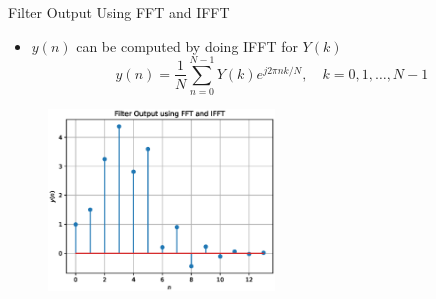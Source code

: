 \documentclass{beamer}
\begin{document}
\begin{frame}{Filter Output Using FFT and IFFT}
\begin{itemize}
    \item $y(n)$ can be computed by doing IFFT for $Y(k)$
    \[y(n) = \frac{1}{N}\sum_{n=0}^{N-1}Y(k) e^{j 2 \pi n k / N}, \quad k=0,1, \ldots, N-1\]
\end{itemize}
\begin{figure}
    \centering
    \includegraphics[width=6cm]{figs/y_n.eps}
\end{figure}
\end{frame}
\end{document}
